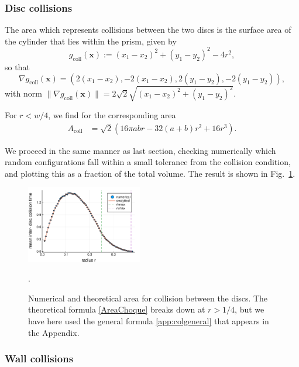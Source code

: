 \documentclass[superscriptaddress,pre,reprint,showpacs,twocolumn]{revtex4-1}
\begin{document}
\subsubsection{Disc collisions}

The area which represents collisions between the two discs is the surface area of the cylinder
that lies within the prism, given by
$$g_\text{coll}(\mathbf{x}) := (x_1 - x_2)^2 + (y_1 - y_2)^2 - 4r^2, $$
so that
$$\nabla g_\text{coll}(\mathbf{x}) = (2 (x_1 - x_2), -2(x_1 - x_2), 2(y_1 - y_2), -2(y_1 - y_2)),$$ 
with norm $\| \nabla g_\text{coll}(\mathbf{x}) \| = 2\sqrt{2} \sqrt{(x_1 - x_2)^2 + (y_1 - y_2)^2}$.


For $r<w/4$, we find for the corresponding area
\begin{align}\label{AreaChoque}
A_\text{coll} & =  \sqrt{2} (
16\pi a b r -32 (a+b)r^2 +16 r^3).
\end{align}

We proceed in the same manner as last section, checking numerically which
random configurations
fall within a small tolerance from the collision condition, and
plotting this as a fraction of the total volume. The result is shown in Fig.~\ref{AreaChoqueTeoyNum}. 
\begin{figure}
\centering
\includegraphics[width=0.45\textwidth]{./figures/AreaCol01.pdf}
\caption{Numerical and theoretical area 
for collision between the discs.  The theoretical formula 
\eqref{AreaChoque} breaks down at
$r > 1/4$, but we have here used the general formula \ref{app:colgeneral}
that appears in the Appendix.}
\label{AreaChoqueTeoyNum}.
\end{figure}


\subsubsection{Wall collisions}
\end{document}
